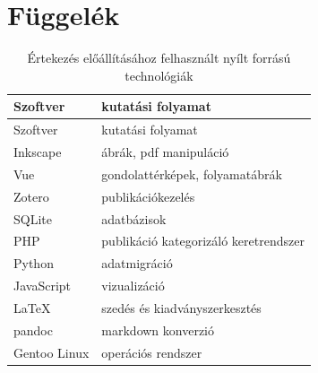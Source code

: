 \documentclass[12pt,magyar,a4paper,oneside]{scrreprt}
\begin{document}
\listoffigures

\listoftables

\newpage

\hypertarget{fuxfcggeluxe9k}{%
\chapter*{Függelék}\label{fuxfcggeluxe9k}}

\hypertarget{tbl:MyFLOSSTech}{}
\begin{longtable}[]{@{}ll@{}}
\caption{\label{tbl:MyFLOSSTech}Értekezés előállításához felhasznált
nyílt forrású technológiák}\tabularnewline
\toprule
Szoftver & kutatási folyamat\tabularnewline
\midrule
\endfirsthead
\toprule
Szoftver & kutatási folyamat\tabularnewline
\midrule
\endhead
Inkscape & ábrák, pdf manipuláció\tabularnewline
Vue & gondolattérképek, folyamatábrák\tabularnewline
Zotero & publikációkezelés\tabularnewline
SQLite & adatbázisok\tabularnewline
PHP & publikáció kategorizáló keretrendszer\tabularnewline
Python & adatmigráció\tabularnewline
JavaScript & vizualizáció\tabularnewline
\LaTeX & szedés és kiadványszerkesztés\tabularnewline
pandoc & markdown konverzió\tabularnewline
Gentoo Linux & operációs rendszer\tabularnewline
\bottomrule
\end{longtable}

\newpage
\thispagestyle{empty}
\end{document}

